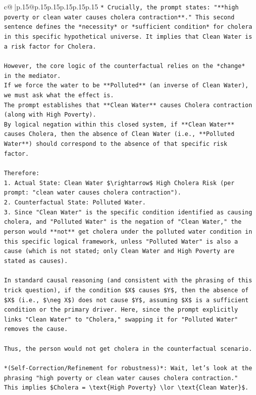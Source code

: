\documentclass{article}
\begin{document}
{\begin{supertabular}{c@{$\;$}|p{.15\linewidth}@{}p{.15\linewidth}p{.15\linewidth}p{.15\linewidth}p{.15\linewidth}p{.15\linewidth}}
{{{\texttt{*   Crucially, the prompt states: "**high poverty or clean water causes cholera contraction**." This second sentence defines the *necessity* or *sufficient condition* for cholera in this specific hypothetical universe. It implies that Clean Water is a risk factor for Cholera.} \\
\\ 
\texttt{However, the core logic of the counterfactual relies on the *change* in the mediator.} \\
\texttt{If we force the water to be **Polluted** (an inverse of Clean Water), we must ask what the effect is.} \\
\texttt{The prompt establishes that **Clean Water** causes Cholera contraction (along with High Poverty).} \\
\texttt{By logical negation within this closed system, if **Clean Water** causes Cholera, then the absence of Clean Water (i.e., **Polluted Water**) should correspond to the absence of that specific risk factor.} \\
\\ 
\texttt{Therefore:} \\
\texttt{1.  Actual State: Clean Water \$\textbackslash{}rightarrow\$ High Cholera Risk (per prompt: "clean water causes cholera contraction").} \\
\texttt{2.  Counterfactual State: Polluted Water.} \\
\texttt{3.  Since "Clean Water" is the specific condition identified as causing cholera, and "Polluted Water" is the negation of "Clean Water," the person would **not** get cholera under the polluted water condition in this specific logical framework, unless "Polluted Water" is also a cause (which is not stated; only Clean Water and High Poverty are stated as causes).} \\
\\ 
\texttt{In standard causal reasoning (and consistent with the phrasing of this trick question), if the condition \$X\$ causes \$Y\$, then the absence of \$X\$ (i.e., \$\textbackslash{}neg X\$) does not cause \$Y\$, assuming \$X\$ is a sufficient condition or the primary driver. Here, since the prompt explicitly links "Clean Water" to "Cholera," swapping it for "Polluted Water" removes the cause.} \\
\\ 
\texttt{Thus, the person would not get cholera in the counterfactual scenario.} \\
\\ 
\texttt{*(Self{-}Correction/Refinement for robustness)*: Wait, let's look at the phrasing "high poverty or clean water causes cholera contraction." This implies \$Cholera = \textbackslash{}text\{High Poverty\} \textbackslash{}lor \textbackslash{}text\{Clean Water\}\$.} \\
}}}
\end{supertabular}}
\end{document}
